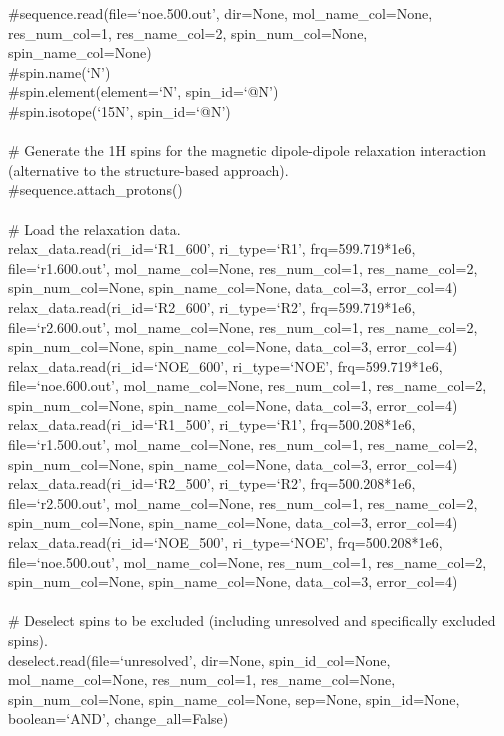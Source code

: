 \begin{htmlonly}
\begin{htmlonly}
\begin{exampleenv}
\#sequence.read(file=`noe.500.out', dir=None, mol\_name\_col=None, res\_num\_col=1, res\_name\_col=2, spin\_num\_col=None, spin\_name\_col=None) \\
\#spin.name(`N') \\
\#spin.element(element=`N', spin\_id=`@N') \\
\#spin.isotope(`15N', spin\_id=`@N') \\
 \\
\# Generate the 1H spins for the magnetic dipole-dipole relaxation interaction (alternative to the structure-based approach). \\
\#sequence.attach\_protons() \\
 \\
\# Load the relaxation data. \\
relax\_data.read(ri\_id=`R1\_600',  ri\_type=`R1',  frq=599.719*1e6, file=`r1.600.out',  mol\_name\_col=None, res\_num\_col=1, res\_name\_col=2, spin\_num\_col=None, spin\_name\_col=None, data\_col=3, error\_col=4) \\
relax\_data.read(ri\_id=`R2\_600',  ri\_type=`R2',  frq=599.719*1e6, file=`r2.600.out',  mol\_name\_col=None, res\_num\_col=1, res\_name\_col=2, spin\_num\_col=None, spin\_name\_col=None, data\_col=3, error\_col=4) \\
relax\_data.read(ri\_id=`NOE\_600', ri\_type=`NOE', frq=599.719*1e6, file=`noe.600.out', mol\_name\_col=None, res\_num\_col=1, res\_name\_col=2, spin\_num\_col=None, spin\_name\_col=None, data\_col=3, error\_col=4) \\
relax\_data.read(ri\_id=`R1\_500',  ri\_type=`R1',  frq=500.208*1e6, file=`r1.500.out',  mol\_name\_col=None, res\_num\_col=1, res\_name\_col=2, spin\_num\_col=None, spin\_name\_col=None, data\_col=3, error\_col=4) \\
relax\_data.read(ri\_id=`R2\_500',  ri\_type=`R2',  frq=500.208*1e6, file=`r2.500.out',  mol\_name\_col=None, res\_num\_col=1, res\_name\_col=2, spin\_num\_col=None, spin\_name\_col=None, data\_col=3, error\_col=4) \\
relax\_data.read(ri\_id=`NOE\_500', ri\_type=`NOE', frq=500.208*1e6, file=`noe.500.out', mol\_name\_col=None, res\_num\_col=1, res\_name\_col=2, spin\_num\_col=None, spin\_name\_col=None, data\_col=3, error\_col=4) \\
 \\
\# Deselect spins to be excluded (including unresolved and specifically excluded spins). \\
deselect.read(file=`unresolved', dir=None, spin\_id\_col=None, mol\_name\_col=None, res\_num\_col=1, res\_name\_col=None, spin\_num\_col=None, spin\_name\_col=None, sep=None, spin\_id=None, boolean=`AND', change\_all=False) \\

\end{exampleenv}
\end{htmlonly}
\end{htmlonly}
